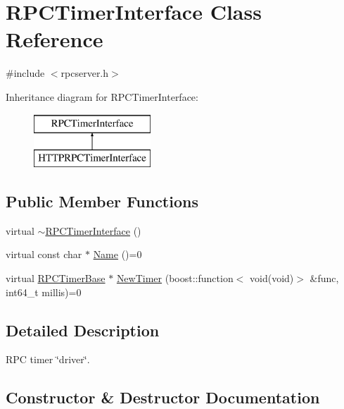 \hypertarget{class_r_p_c_timer_interface}{}\section{R\+P\+C\+Timer\+Interface Class Reference}
\label{class_r_p_c_timer_interface}


{\ttfamily \#include $<$rpcserver.\+h$>$}

Inheritance diagram for R\+P\+C\+Timer\+Interface\+:\begin{figure}[H]
\begin{center}
\leavevmode
\includegraphics[height=2.000000cm]{class_r_p_c_timer_interface}
\end{center}
\end{figure}
\subsection*{Public Member Functions}
\begin{DoxyCompactItemize}
\item 
virtual \mbox{\hyperlink{class_r_p_c_timer_interface_a602365351a3a0be637aabeed4cb33223}{$\sim$\+R\+P\+C\+Timer\+Interface}} ()
\item 
virtual const char $\ast$ \mbox{\hyperlink{class_r_p_c_timer_interface_afbb7a79b18bdbc1a6900ba8eb882c5b3}{Name}} ()=0
\item 
virtual \mbox{\hyperlink{class_r_p_c_timer_base}{R\+P\+C\+Timer\+Base}} $\ast$ \mbox{\hyperlink{class_r_p_c_timer_interface_a4588767c14008834cb7f035a3f2de2e9}{New\+Timer}} (boost\+::function$<$ void(void)$>$ \&func, int64\+\_\+t millis)=0
\end{DoxyCompactItemize}


\subsection{Detailed Description}
R\+PC timer \char`\"{}driver\char`\"{}. 

\subsection{Constructor \& Destructor Documentation}
\mbox{\label{class_r_p_c_timer_interface_a602365351a3a0be637aabeed4cb33223}} 
